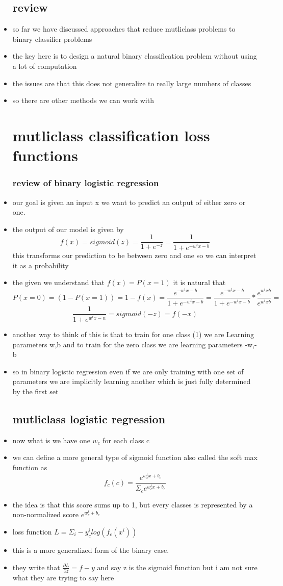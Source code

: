 \documentclass{article}
\begin{document}
\begin{itemize}
\subsection*{review}
\item so far we have discussed approaches that reduce mutliclass problems to binary classifier problems
\item the key here is to design a natural binary classification problem without using a lot of computation
\item the issues are that this does not generalize to really large numbers of classes 
\item so there are other methods we can work with 
\section{mutliclass classification loss functions}
\subsubsection*{review of binary logistic regression}
\item our goal is given an input x we want to predict an output of either zero or one. 
\item the output of our model is given by $$f(x)=sigmoid(z)=\frac{1}{1+e^{-z}}=\frac{1}{1+e^{-w^{t}x-b}}$$ this transforms our prediction to be between zero and one so we can interpret it as a probability
\item the given we understand that $f(x)=P(x=1)$ it is natural that $$P(x=0)=(1-P(x=1))=1-f(x)=\frac{e^{-w^tx-b}}{1+e^{-w^tx-b}}=\frac{e^{-w^tx-b}}{1+e^{-w^tx-b}}*\frac{e^{w^txb}}{e^{w^txb}}=$$ $$\frac{1}{1+e^{w^tx-n}}=sigmoid(-z)=f(-x)$$
\item another way to think of this is that to train for one class (1) we are Learning parameters w,b and to train for the zero class we are learning parameters -w,-b
\item so in binary logistic regression even if we are only training with one set of parameters we are implicitly learning another which is just fully determined by the first set
\subsection*{mutliclass logistic regression}
\item now what is we have one $w_c$ for each class c
\item we can define a  more general type of sigmoid function also called the soft max function as $$f_{c}(c)=\frac{e^{w_{c}^tx+b_c}}{\Sigma_{c}e^{w_{c}^tx+b_c}}$$
\item the idea is that this score sums up to 1, but every classes is represented by a non-normalized score $e^{w_c^t+b_c}$
\item loss function $L=\Sigma_{i}-y_c^ilog(f_c(x^i))$ 
\item this is a more generalized form of the binary case. 
\item they write that $\frac{\partial L}{\partial z}=f-y$ and say z is the sigmoid function but i am not sure what they are trying to say here

\end{itemize}
\end{document}

